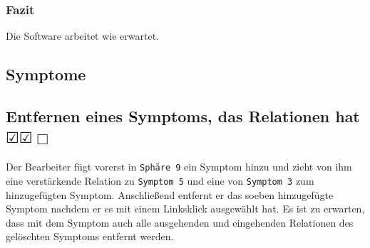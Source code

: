 \documentclass[enabledeprecatedfontcommands]{scrartcl}
\newcommand{\subsectiont}[2]{\subsection[#1]{#1{\normalsize\normalfont #2}}}
\newcommand{\leer}{$\Box$}
\newcommand{\ok}{$\CheckedBox$}
\begin{document}
\subsubsection{Fazit}
Die Software arbeitet wie erwartet.

\subsection*{Symptome}

\subsectiont{Entfernen eines Symptoms, das Relationen hat}{\dotfill\ok\ok\leer}
Der Bearbeiter fügt vorerst in \texttt{Sphäre 9} ein Symptom hinzu und zieht von ihm eine verstärkende Relation zu \texttt{Symptom 5} und eine von \texttt{Symptom 3} zum hinzugefügten Symptom. Anschließend entfernt er das soeben hinzugefügte Symptom nachdem er es mit einem Linksklick ausgewählt hat. Es ist zu erwarten, dass mit dem Symptom auch alle ausgehenden und eingehenden Relationen des gelöschten Symptoms entfernt werden. 
\end{document}
